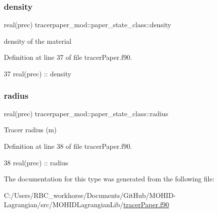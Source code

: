 \subsubsection{\texorpdfstring{density}{density}}
{\footnotesize\ttfamily real(prec) tracerpaper\+\_\+mod\+::paper\+\_\+state\+\_\+class\+::density\hspace{0.3cm}{\ttfamily [private]}}



density of the material 



Definition at line 37 of file tracer\+Paper.\+f90.


\begin{DoxyCode}
37         \textcolor{keywordtype}{real(prec)} :: density
\end{DoxyCode}
\mbox{\label{structtracerpaper__mod_1_1paper__state__class_aca8ba08eafd11071094fd7749b6bf3c7}} 
\subsubsection{\texorpdfstring{radius}{radius}}
{\footnotesize\ttfamily real(prec) tracerpaper\+\_\+mod\+::paper\+\_\+state\+\_\+class\+::radius\hspace{0.3cm}{\ttfamily [private]}}



Tracer radius (m) 



Definition at line 38 of file tracer\+Paper.\+f90.


\begin{DoxyCode}
38         \textcolor{keywordtype}{real(prec)} :: radius
\end{DoxyCode}


The documentation for this type was generated from the following file\+:\begin{DoxyCompactItemize}
\item 
C\+:/\+Users/\+R\+B\+C\+\_\+workhorse/\+Documents/\+Git\+Hub/\+M\+O\+H\+I\+D-\/\+Lagrangian/src/\+M\+O\+H\+I\+D\+Lagrangian\+Lib/\mbox{\hyperlink{tracer_paper_8f90}{tracer\+Paper.\+f90}}\end{DoxyCompactItemize}
